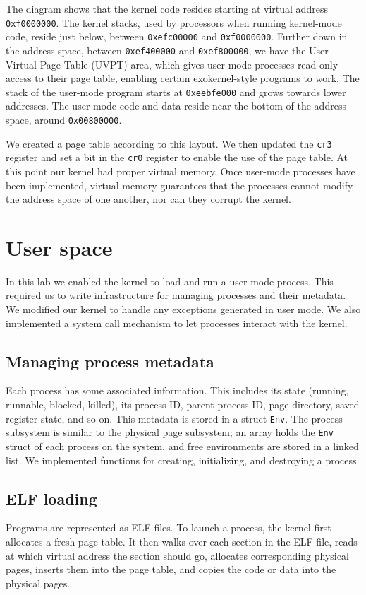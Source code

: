 \documentclass{report}
\begin{document}
The diagram shows that the kernel code resides starting at virtual address
\texttt{0xf0000000}. The kernel stacks, used by processors when running
kernel-mode code, reside just below, between \texttt{0xefc00000} and
\texttt{0xf0000000}. Further down in the address space, between
\texttt{0xef400000} and \texttt{0xef800000}, we have the User Virtual Page
Table (UVPT) area, which gives user-mode processes read-only access to their
page table, enabling certain exokernel-style programs to work. The stack of
the user-mode program starts at \texttt{0xeebfe000} and grows towards lower
addresses. The user-mode code and data reside near the bottom of the address
space, around \texttt{0x00800000}.

We created a page table according to this layout. We then updated the
\texttt{cr3} register and set a bit in the \texttt{cr0} register to enable the
use of the page table. At this point our kernel had proper virtual memory.
Once user-mode processes have been implemented, virtual memory guarantees that
the processes cannot modify the address space of one another, nor can they
corrupt the kernel.


\chapter{User space}
In this lab we enabled the kernel to load and run a user-mode process. This
required us to write infrastructure for managing processes and their metadata.
We modified our kernel to handle any exceptions generated in user mode. We
also implemented a system call mechanism to let processes interact with the
kernel.


\section{Managing process metadata}
Each process has some associated information. This includes its state
(running, runnable, blocked, killed), its process ID, parent process ID, page
directory, saved register state, and so on. This metadata is stored in a
struct \texttt{Env}. The process subsystem is similar to the physical page
subsystem; an array holds the \texttt{Env} struct of each process on the
system, and free environments are stored in a linked list. We implemented
functions for creating, initializing, and destroying a process.

\section{ELF loading}
Programs are represented as ELF files. To launch a process, the kernel first
allocates a fresh page table. It then walks over each section in the ELF file,
reads at which virtual address the section should go, allocates corresponding
physical pages, inserts them into the page table, and copies the code or data
into the physical pages.
\end{document}
